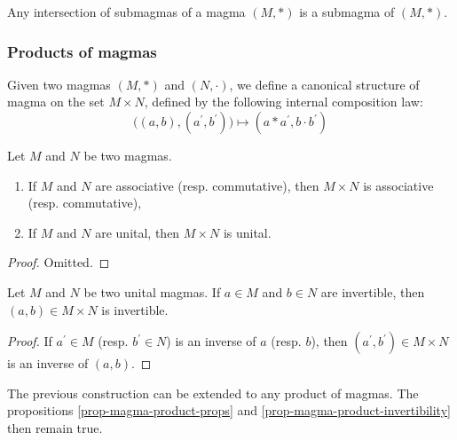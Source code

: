 \documentclass[12pt]{report}
\begin{document}
\begin{remark} \label{rem-magma-submagmas-intersection}
    Any intersection of submagmas of a magma $(M, \ast)$ is a submagma of $(M, \ast)$.
\end{remark}

\subsubsection{Products of magmas}

\begin{definition} \label{def-magma-product}
    Given two magmas $(M, \ast)$ and $(N, \cdot)$, we define a canonical structure of magma on the set $M \times N$, defined by the following internal composition law:
    \[
        \big((a, b), (a^{\prime}, b^{\prime}) \big) \mapsto (a \ast a^{\prime}, b \cdot b^{\prime})
    \]
\end{definition}

\begin{proposition} \label{prop-magma-product-props}
    Let $M$ and $N$ be two magmas.
    \begin{enumerate}[label=(\roman*)]
        \item If $M$ and $N$ are associative (resp. commutative), then $M \times N$ is associative (resp. commutative),
        \item If $M$ and $N$ are unital, then $M \times N$ is unital.
    \end{enumerate}
\end{proposition}

\begin{proof}
    Omitted.
\end{proof}

\begin{proposition} \label{prop-magma-product-invertibility}
    Let $M$ and $N$ be two unital magmas. If $a \in M$ and $b \in N$ are invertible, then $(a, b) \in M \times N$ is invertible.
\end{proposition}

\begin{proof}
    If $a^{\prime} \in M$ (resp. $b^{\prime} \in N$) is an inverse of $a$ (resp. $b$), then $(a^{\prime}, b^{\prime}) \in M \times N$ is an inverse of $(a, b)$.
\end{proof}

\begin{remark}
    The previous construction can be extended to any product of magmas. The propositions \ref{prop-magma-product-props} and \ref{prop-magma-product-invertibility} then remain true.
\end{remark}
\end{document}
